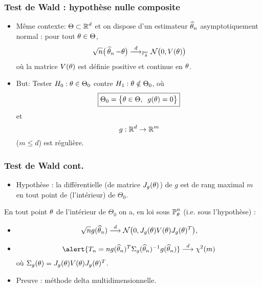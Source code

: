 \begin{frame}
\frametitle{Test de Wald : hypothèse nulle composite}
\begin{itemize}
\item \alert{ Même contexte:} $\Theta \subset \operatorname{{\mathbb R}}^d$ et \alert{on dispose} d'un
  estimateur $\operatorname{\widehat \theta_{\mathnormal{n}}}$ asymptotiquement normal : pour tout $\theta \in \Theta$,
$$\sqrt{n}\big(\operatorname{\widehat \theta_{\mathnormal{n}}}-\theta\big)\stackrel{d}{\longrightarrow}_{\operatorname{{\mathbb P}}_{\theta}^n} {\mathcal N}\big(0, V(\theta)\big)$$
où la matrice $V(\theta)$ est \alert{définie positive} et continue en $\theta$.
\item \alert{But:} Tester $H_0: \theta \in \Theta_0$ contre $H_1:\theta \notin \Theta_0$, où
$$\boxed{\Theta_0 = \big\{\theta \in \Theta,\;\;g(\theta) = 0\big\}}$$
et
$$g:\operatorname{{\mathbb R}}^d \rightarrow \operatorname{{\mathbb R}}^m$$
($m \leq d$) est régulière.
\end{itemize}
\end{frame}




\begin{frame}
\frametitle{Test de Wald cont.}
\begin{itemize}
\item \alert{Hypothèse : } la différentielle (de matrice $J_g(\theta)$) de $g$ est de rang maximal $m$ en tout point de (l'intérieur) de $\Theta_0$.
\end{itemize}
\begin{prop}
  En tout point $\theta$ de l'intérieur de $\Theta_0$ on a, en loi sous
  $\operatorname{{\mathbb P}}_\theta^n$ (i.e. \alert{sous l'hypothèse}) :
\begin{itemize}
\item $$\sqrt{n}g(\operatorname{\widehat \theta_{\mathnormal{n}}}) \stackrel{d}{\longrightarrow} {\mathcal N}\big(0, J_g(\theta)V(\theta)J_g(\theta)^T\big),$$
\item $$\alert{T_n=ng(\est)^T\Sigma_g(\est)^{-1}g(\est)} \stackrel{d}{\longrightarrow} \chi^2(m)$$
où $\Sigma_g(\theta) =J_g(\theta) V(\theta) J_g(\theta)^T$.
\end{itemize}
\end{prop}
\begin{itemize}
\item Preuve : méthode  delta  multidimensionnelle.
\end{itemize}
\end{frame}

